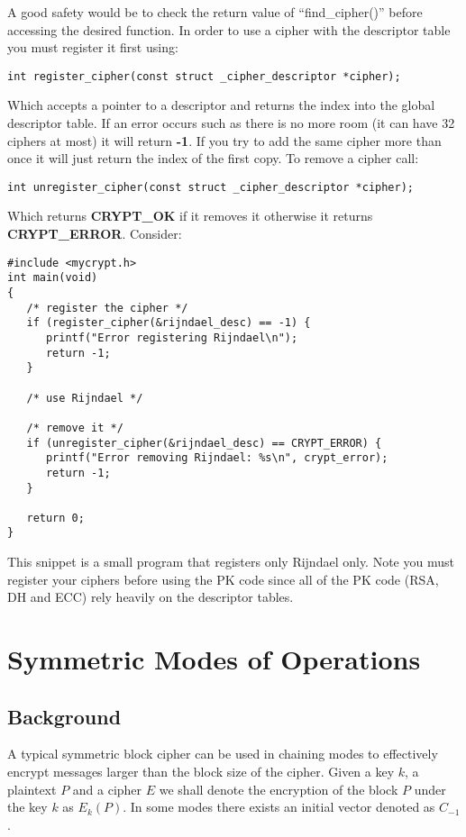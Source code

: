 \documentclass{book}
\begin{document}
A good safety would be to check the return value of ``find\_cipher()'' before accessing the desired function.  In order
to use a cipher with the descriptor table you must register it first using:
\begin{verbatim}
int register_cipher(const struct _cipher_descriptor *cipher);
\end{verbatim}
Which accepts a pointer to a descriptor and returns the index into the global descriptor table.  If an error occurs such
as there is no more room (it can have 32 ciphers at most) it will return {\bf{-1}}.  If you try to add the same cipher more
than once it will just return the index of the first copy.  To remove a cipher call:
\begin{verbatim}
int unregister_cipher(const struct _cipher_descriptor *cipher);
\end{verbatim}
Which returns {\bf CRYPT\_OK} if it removes it otherwise it returns {\bf CRYPT\_ERROR}.  Consider:
\begin{small}
\begin{verbatim}
#include <mycrypt.h>
int main(void)
{
   /* register the cipher */
   if (register_cipher(&rijndael_desc) == -1) {
      printf("Error registering Rijndael\n");
      return -1;
   }

   /* use Rijndael */

   /* remove it */
   if (unregister_cipher(&rijndael_desc) == CRYPT_ERROR) {
      printf("Error removing Rijndael: %s\n", crypt_error);
      return -1;
   }

   return 0;
}
\end{verbatim}
\end{small}
This snippet is a small program that registers only Rijndael only.  Note you must register your ciphers before
using the PK code since all of the PK code (RSA, DH and ECC) rely heavily on the descriptor tables.

\section{Symmetric Modes of Operations}
\subsection{Background}
A typical symmetric block cipher can be used in chaining modes to effectively encrypt messages larger than the block
size of the cipher.  Given a key $k$, a plaintext $P$ and a cipher $E$ we shall denote the encryption of the block
$P$ under the key $k$ as $E_k(P)$.  In some modes there exists an initial vector denoted as $C_{-1}$.
\end{document}
